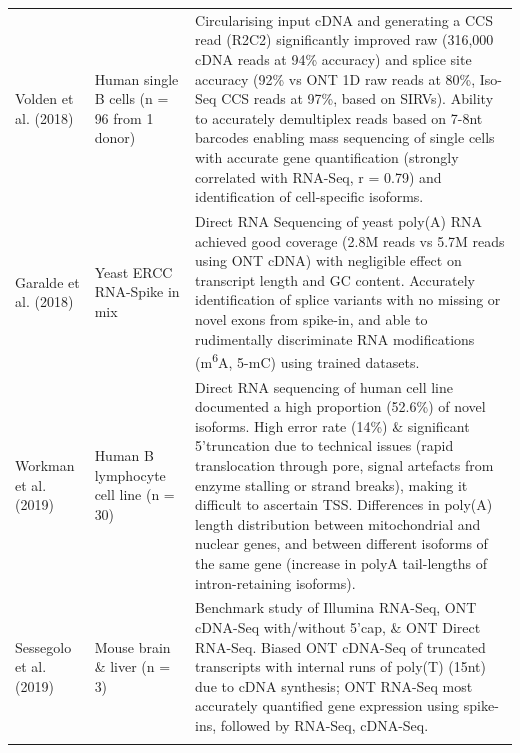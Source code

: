 \begin{landscape}
\begin{longtable}[c]{p{4cm}p{4cm}p{18cm}}
		\centering Volden et al. (2018) \cite{Volden2018} &
		\centering Human single B cells (n = 96 from 1 donor) &
		\tabitem Circularising input cDNA and generating a CCS read (R2C2) significantly improved raw (316,000 cDNA reads at 94\% accuracy) and splice site accuracy (92\% vs ONT 1D raw reads at 80\%, Iso-Seq CCS reads at 97\%, based on SIRVs). \newline 
		\tabitem Ability to accurately demultiplex reads based on 7-8nt barcodes enabling mass sequencing of single cells with accurate gene quantification (strongly correlated with RNA-Seq, r = 0.79) and identification of cell-specific isoforms. \\
		\hdashline[0.5pt/5pt]
		
		
		\centering Garalde et al. (2018) \cite{Garalde2018} &
		\centering Yeast \newline ERCC RNA-Spike in mix &
		\tabitem Direct RNA Sequencing of yeast poly(A) RNA achieved good coverage (2.8M reads vs 5.7M reads using ONT cDNA) with negligible effect on transcript length and GC content. \newline 
		\tabitem Accurately identification of splice variants with no missing or novel exons from spike-in, and able to rudimentally discriminate RNA modifications (m\textsuperscript{6}A, 5-mC) using trained datasets.  \\
		
		\centering Workman et al. (2019) \cite{Workman2019a} &
		\centering Human B lymphocyte cell line (n = 30) &
		\tabitem Direct RNA sequencing of human cell line documented a high proportion (52.6\%) of novel isoforms. \newline
		\tabitem High error rate (14\%) \& significant 5'truncation due to technical issues (rapid translocation through pore, signal artefacts from enzyme stalling or strand breaks), making it difficult to ascertain TSS. \newline
		\tabitem Differences in poly(A) length distribution between mitochondrial and nuclear genes, and between different isoforms of the same gene (increase in polyA tail-lengths of intron-retaining isoforms). \\
		\hdashline[0.5pt/5pt]

		
		\centering Sessegolo et al. (2019) \cite{Sessegolo2019} &
		\centering Mouse brain \& liver \newline(n = 3) &
		\tabitem Benchmark study of Illumina RNA-Seq, ONT cDNA-Seq with/without 5'cap, \& ONT Direct RNA-Seq. \newline
		\tabitem Biased ONT cDNA-Seq of truncated transcripts with internal runs of poly(T) (15nt) due to cDNA synthesis; ONT RNA-Seq most accurately quantified gene expression using spike-ins, followed by RNA-Seq, cDNA-Seq.  \\
		\hdashline[0.5pt/5pt]
		

\end{longtable}
\end{landscape}
